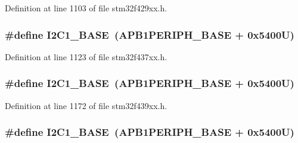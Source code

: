 Definition at line 1103 of file stm32f429xx.\+h.

\subsubsection[{\texorpdfstring{I2\+C1\+\_\+\+B\+A\+SE}{I2C1_BASE}}]{\setlength{\rightskip}{0pt plus 5cm}\#define I2\+C1\+\_\+\+B\+A\+SE~({\bf A\+P\+B1\+P\+E\+R\+I\+P\+H\+\_\+\+B\+A\+SE} + 0x5400\+U)}\hypertarget{group___peripheral__memory__map_gacd72dbffb1738ca87c838545c4eb85a3}{}\label{group___peripheral__memory__map_gacd72dbffb1738ca87c838545c4eb85a3}


Definition at line 1123 of file stm32f437xx.\+h.

\subsubsection[{\texorpdfstring{I2\+C1\+\_\+\+B\+A\+SE}{I2C1_BASE}}]{\setlength{\rightskip}{0pt plus 5cm}\#define I2\+C1\+\_\+\+B\+A\+SE~({\bf A\+P\+B1\+P\+E\+R\+I\+P\+H\+\_\+\+B\+A\+SE} + 0x5400\+U)}\hypertarget{group___peripheral__memory__map_gacd72dbffb1738ca87c838545c4eb85a3}{}\label{group___peripheral__memory__map_gacd72dbffb1738ca87c838545c4eb85a3}


Definition at line 1172 of file stm32f439xx.\+h.

\subsubsection[{\texorpdfstring{I2\+C1\+\_\+\+B\+A\+SE}{I2C1_BASE}}]{\setlength{\rightskip}{0pt plus 5cm}\#define I2\+C1\+\_\+\+B\+A\+SE~({\bf A\+P\+B1\+P\+E\+R\+I\+P\+H\+\_\+\+B\+A\+SE} + 0x5400\+U)}\hypertarget{group___peripheral__memory__map_gacd72dbffb1738ca87c838545c4eb85a3}{}\label{group___peripheral__memory__map_gacd72dbffb1738ca87c838545c4eb85a3}



